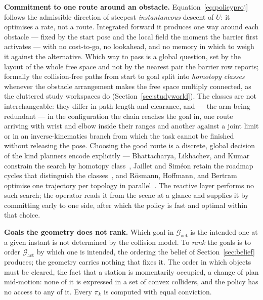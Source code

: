 \documentclass[12pt,a4paper,twoside,openright]{report}
\begin{document}
\textbf{Commitment to one route around an obstacle.} Equation~\eqref{eq:policyproj} follows the admissible direction of steepest \emph{instantaneous} descent of $U$: it optimises a rate, not a route. Integrated forward it produces one way around each obstacle --- fixed by the start pose and the local field the moment the barrier first activates --- with no cost-to-go, no lookahead, and no memory in which to weigh it against the alternative. Which way to pass is a global question, set by the layout of the whole free space and not by the nearest pair the barrier row reports; formally the collision-free paths from start to goal split into \emph{homotopy classes} whenever the obstacle arrangement makes the free space multiply connected, as the cluttered study workspaces do (Section~\ref{sec:studyworld}). The classes are not interchangeable: they differ in path length and clearance, and --- the arm being redundant --- in the configuration the chain reaches the goal in, one route arriving with wrist and elbow inside their ranges and another against a joint limit or in an inverse-kinematics branch from which the task cannot be finished without releasing the pose. Choosing the good route is a discrete, global decision of the kind planners encode explicitly --- Bhattacharya, Likhachev, and Kumar constrain the search by homotopy class~\cite{bhattacharya2012topological}, Jaillet and Sim\'eon retain the roadmap cycles that distinguish the classes~\cite{jaillet2008deformation}, and R\"osmann, Hoffmann, and Bertram optimise one trajectory per topology in parallel~\cite{rosmann2017topologies}. The reactive layer performs no such search; the operator reads it from the scene at a glance and supplies it by committing early to one side, after which the policy is fast and optimal within that choice.

\textbf{Goals the geometry does not rank.} Which goal in $\mathcal{G}_{\text{act}}$ is the intended one at a given instant is not determined by the collision model. To \emph{rank} the goals is to order $\mathcal{G}_{\text{act}}$ by which one is intended, the ordering the belief of Section~\ref{sec:belief} produces; the geometry carries nothing that fixes it. The order in which objects must be cleared, the fact that a station is momentarily occupied, a change of plan mid-motion: none of it is expressed in a set of convex colliders, and the policy has no access to any of it. Every $\pi_k$ is computed with equal conviction.
\end{document}
